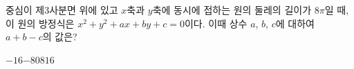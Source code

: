 중심이 제$3$사분면 위에 있고 $x$축과 $y$축에 동시에 접하는 원의 둘레의 길이가 $8\pi$일 때, 이 원의 방정식은 $x^2+y^2+ax+by+c=0$이다. 이때 상수 $a$, $b$, $c$에 대하여 $a+b-c$의 값은?
\begin{choices32}{$-16$}{$-8$}{$0$}{$8$}{$16$}\end{choices32}
